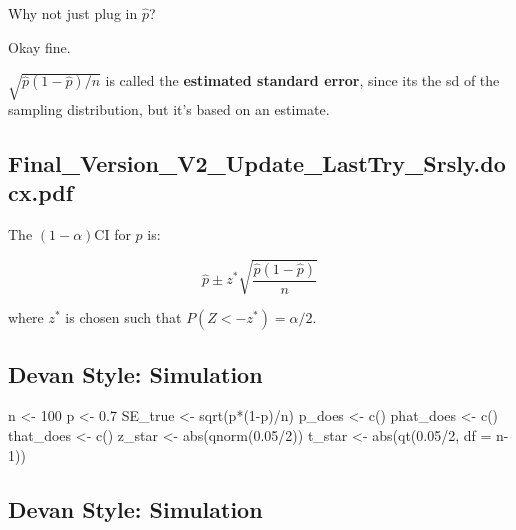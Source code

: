 \documentclass[
  letterpaper,
  DIV=11,
  numbers=noendperiod]{scrreprt}
\newenvironment{Shaded}{\begin{snugshade}}{\end{snugshade}}
\newcommand{\AttributeTok}[1]{\textcolor[rgb]{0.40,0.45,0.13}{#1}}
\newcommand{\DecValTok}[1]{\textcolor[rgb]{0.68,0.00,0.00}{#1}}
\newcommand{\FloatTok}[1]{\textcolor[rgb]{0.68,0.00,0.00}{#1}}
\newcommand{\FunctionTok}[1]{\textcolor[rgb]{0.28,0.35,0.67}{#1}}
\newcommand{\NormalTok}[1]{\textcolor[rgb]{0.00,0.23,0.31}{#1}}
\newcommand{\OtherTok}[1]{\textcolor[rgb]{0.00,0.23,0.31}{#1}}
\newcommand{\SpecialCharTok}[1]{\textcolor[rgb]{0.37,0.37,0.37}{#1}}
\def\pause{}
\begin{document}
\quad

Why not just plug in \(\hat p\)?\pause

Okay fine. \pause

\(\sqrt{\hat p(1-\hat p)/n}\) is called the \textbf{estimated standard
error}, since its the sd of the sampling distribution, but it's based on
an estimate.

\hypertarget{final_version_v2_update_lasttry_srsly.docx.pdf}{%
\subsection{Final\_Version\_V2\_Update\_LastTry\_Srsly.docx.pdf}\label{final_version_v2_update_lasttry_srsly.docx.pdf}}

The \((1-\alpha)\)CI for \(p\) is:

\[
\hat p \pm z^*\sqrt{\frac{\hat p(1-\hat p)}{n}}
\]

where \(z^*\) is chosen such that \(P(Z < -z^*) = \alpha/2\).

\hypertarget{devan-style-simulation}{%
\subsection{Devan Style: Simulation}\label{devan-style-simulation}}

\begin{Shaded}
\begin{Highlighting}[]
\NormalTok{n }\OtherTok{\textless{}{-}} \DecValTok{100}
\NormalTok{p }\OtherTok{\textless{}{-}} \FloatTok{0.7}
\NormalTok{SE\_true }\OtherTok{\textless{}{-}} \FunctionTok{sqrt}\NormalTok{(p}\SpecialCharTok{*}\NormalTok{(}\DecValTok{1}\SpecialCharTok{{-}}\NormalTok{p)}\SpecialCharTok{/}\NormalTok{n)}
\NormalTok{p\_does }\OtherTok{\textless{}{-}} \FunctionTok{c}\NormalTok{()}
\NormalTok{phat\_does }\OtherTok{\textless{}{-}} \FunctionTok{c}\NormalTok{()}
\NormalTok{that\_does }\OtherTok{\textless{}{-}} \FunctionTok{c}\NormalTok{()}
\NormalTok{z\_star }\OtherTok{\textless{}{-}} \FunctionTok{abs}\NormalTok{(}\FunctionTok{qnorm}\NormalTok{(}\FloatTok{0.05}\SpecialCharTok{/}\DecValTok{2}\NormalTok{))}
\NormalTok{t\_star }\OtherTok{\textless{}{-}} \FunctionTok{abs}\NormalTok{(}\FunctionTok{qt}\NormalTok{(}\FloatTok{0.05}\SpecialCharTok{/}\DecValTok{2}\NormalTok{, }\AttributeTok{df =}\NormalTok{ n}\DecValTok{{-}1}\NormalTok{))}
\end{Highlighting}
\end{Shaded}

\hypertarget{devan-style-simulation-1}{%
\subsection{Devan Style: Simulation}\label{devan-style-simulation-1}}
\end{document}
